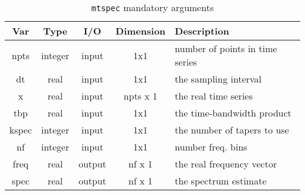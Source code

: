 \documentclass{article}
\begin{document}
\begin{table}[htdp]
\caption{\texttt{mtspec} mandatory arguments}
\begin{center}
\begin{tabular}{|c|c|c|c|l|}
\hline
\textbf{Var} &	\textbf{Type}	&  \textbf{I/O}	&	\textbf{Dimension}	&	\textbf{Description}		\\
\hline	\hline
npts		& 	integer	& input &	1x1				&	number of points in time series 		\\
dt		&	real		& input &	1x1				&	the sampling interval				\\
x		&	real		& input &	npts x 1			&	the real time series				\\
tbp		&	real		& input &	1x1				&	the time-bandwidth product		\\
kspec	&	integer	& input &	1x1				&	the number of tapers to use		\\
nf		&	integer	& input &	1x1				&	number freq. bins 		\\
freq		&	real		& output &	nf x 1			&	the real frequency vector			\\
spec		&	real		& output &	nf x 1			&	the spectrum estimate			\\
\hline
\end{tabular}
\end{center}
\label{tab:mtspec_arg}
\end{table}%
\end{document}
